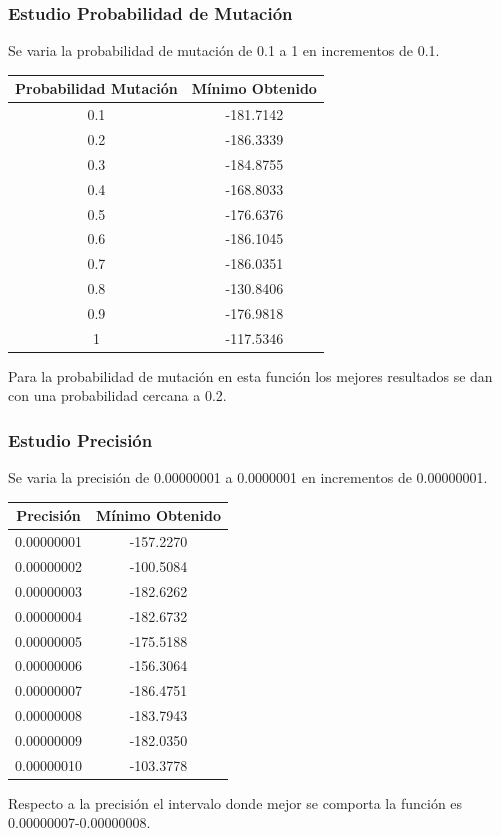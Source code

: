 \documentclass[12pt]{article}
\begin{document}
\subsubsection*{Estudio Probabilidad de Mutación}
	Se varia la probabilidad de mutación de 0.1 a 1 en incrementos de 0.1.
\begin{table}[H]
\begin{center}
\begin{tabular}{|cc|} \hline
Probabilidad Mutación & Mínimo Obtenido \\  \hline
0.1 & -181.7142 \\ 
0.2 & -186.3339 \\ 
0.3 & -184.8755 \\
0.4 & -168.8033 \\
0.5 & -176.6376 \\
0.6 & -186.1045 \\
0.7 & -186.0351 \\
0.8 & -130.8406 \\ 
0.9 & -176.9818 \\
1   & -117.5346 \\  \hline
\end{tabular}
\end{center}
\end{table}
	Para la probabilidad de mutación en esta función los mejores resultados se dan con una probabilidad cercana a 0.2.

\subsubsection*{Estudio Precisión}
	Se varia la precisión de 0.00000001 a 0.0000001 en incrementos de 0.00000001.
\begin{table}[H]
\begin{center}
\begin{tabular}{|cc|} \hline
Precisión & Mínimo Obtenido \\  \hline
0.00000001 & -157.2270 \\ 
0.00000002 & -100.5084 \\ 
0.00000003 & -182.6262 \\
0.00000004 & -182.6732 \\
0.00000005 & -175.5188 \\
0.00000006 & -156.3064 \\
0.00000007 & -186.4751 \\
0.00000008 & -183.7943 \\ 
0.00000009 & -182.0350 \\
0.00000010 & -103.3778 \\  \hline
\end{tabular}
\end{center}
\end{table}
	Respecto a la precisión el intervalo donde mejor se comporta la función es 0.00000007-0.00000008.
\end{document}
